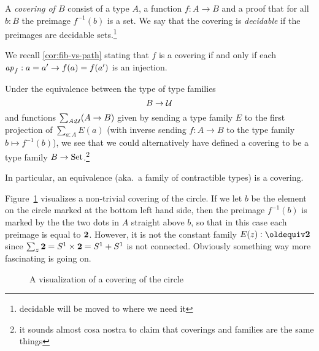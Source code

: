 \begin{definition}\label{def:covering}
A \emph{covering of $B$} consist of a type $A$, a function $f:A\to B$
and a proof that for all $b:B$ the preimage $f^{-1}(b)$ is a  set.  
We say that the covering is \emph{decidable} if the preimages are 
decidable sets.\footnote{decidable will be moved to where we need it}
\end{definition}

We recall \cref{cor:fib-vs-path} stating that $f$ is a covering if and only if 
each $\mathop{{\it ap}_{f}}: a=a'\to f(a)=f(a')$ is an injection.

\begin{remark}\label{rem:coveringsasfamilies}
  Under the equivalence between the type of type families 
$$B\to\mathcal{U}$$ and functions $\sum_{A:\mathcal{U}}(A\to B)$ given by sending a type family $E$ to the first projection of $\sum_{a:A}E(a)$ (with inverse sending $f:A\to B$ to the type family $b\mapsto f^{-1}(b)$), we see that we could alternatively have defined a covering to be a type family $B\to\mathord{\mathrm{Set}}$.\footnote{it sounds almost cosa nostra to claim that coverings and families are the same things}  

In particular, an equivalence (aka.~a family of contractible types) is a covering.
\end{remark}

 Figure~\ref{fig:covering} visualizes a non-trivial covering of the circle.  If we let $b$ be the element on the circle marked at the bottom left hand side, then the preimage $f^{-1}(b)$ is marked by the the two dots in $A$ straight above $b$, so that in this case each preimage is equal to $\mathbf{2}$.  However, it is not the constant family $E(z)\defequi\bn 2$ since $\sum_{z}\mathbf{2}=S^1\times\mathbf{2}=S^1+S^1$ is not connected.  Obviously something way more fascinating is going on.
\begin{figure}
  \centering
  \caption{A visualization of a covering of the circle}
  \label{fig:covering}
\end{figure}



